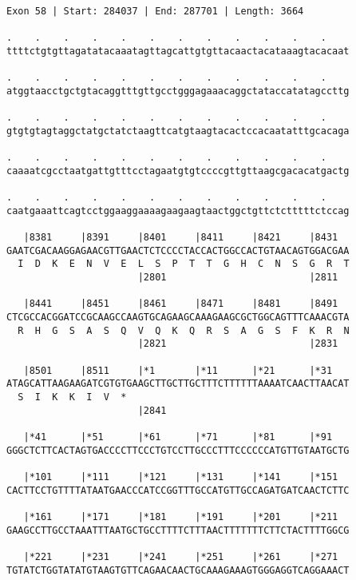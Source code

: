 \documentclass{article}
\begin{document}
\newpage
\begin{Verbatim}[fontfamily=courier]
Exon 58 | Start: 284037 | End: 287701 | Length: 3664

.    .    .    .    .    .    .    .    .    .    .    .    
ttttctgtgttagatatacaaatagttagcattgtgttacaactacataaagtacacaat

.    .    .    .    .    .    .    .    .    .    .    .    
atggtaacctgctgtacaggtttgttgcctgggagaaacaggctataccatatagccttg

.    .    .    .    .    .    .    .    .    .    .    .    
gtgtgtagtaggctatgctatctaagttcatgtaagtacactccacaatatttgcacaga

.    .    .    .    .    .    .    .    .    .    .    .    
caaaatcgcctaatgattgtttcctagaatgtgtccccgttgttaagcgacacatgactg

.    .    .    .    .    .    .    .    .    .    .    .    
caatgaaattcagtcctggaaggaaaagaagaagtaactggctgttctctttttctccag

   |8381     |8391     |8401     |8411     |8421     |8431  
GAATCGACAAGGAGAACGTTGAACTCTCCCCTACCACTGGCCACTGTAACAGTGGACGAA
  I  D  K  E  N  V  E  L  S  P  T  T  G  H  C  N  S  G  R  T
                       |2801                         |2811  

   |8441     |8451     |8461     |8471     |8481     |8491  
CTCGCCACGGATCCGCAAGCCAAGTGCAGAAGCAAAGAAGCGCTGGCAGTTTCAAACGTA
  R  H  G  S  A  S  Q  V  Q  K  Q  R  S  A  G  S  F  K  R  N
                       |2821                         |2831  

   |8501     |8511     |*1       |*11      |*21      |*31   
ATAGCATTAAGAAGATCGTGTGAAGCTTGCTTGCTTTCTTTTTTAAAATCAACTTAACAT
  S  I  K  K  I  V  *   
                       |2841                                

   |*41      |*51      |*61      |*71      |*81      |*91   
GGGCTCTTCACTAGTGACCCCTTCCCTGTCCTTGCCCTTTCCCCCCATGTTGTAATGCTG

   |*101     |*111     |*121     |*131     |*141     |*151  
CACTTCCTGTTTTATAATGAACCCATCCGGTTTGCCATGTTGCCAGATGATCAACTCTTC

   |*161     |*171     |*181     |*191     |*201     |*211  
GAAGCCTTGCCTAAATTTAATGCTGCCTTTTCTTTAACTTTTTTTCTTCTACTTTTGGCG

   |*221     |*231     |*241     |*251     |*261     |*271  
TGTATCTGGTATATGTAAGTGTTCAGAACAACTGCAAAGAAAGTGGGAGGTCAGGAAACT

\end{Verbatim}
\newpage
\end{document}
